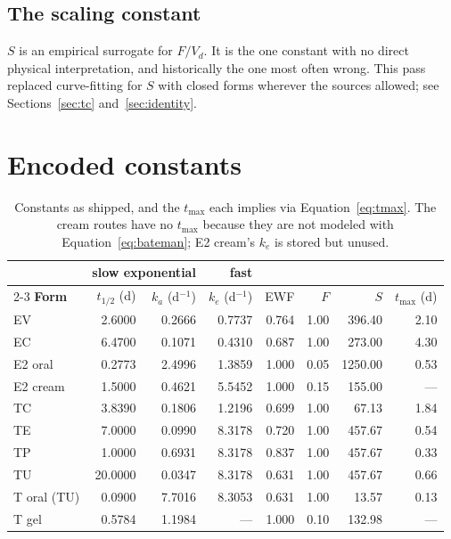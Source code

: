 \documentclass[11pt,a4paper]{article}
\begin{document}
\subsection{The scaling constant}

$S$ is an empirical surrogate for $F/V_d$. It is the one constant with no direct
physical interpretation, and historically the one most often wrong. This pass
replaced curve-fitting for $S$ with closed forms wherever the sources allowed;
see Sections~\ref{sec:tc} and~\ref{sec:identity}.

\section{Encoded constants}

\begin{table}[h]
\centering
\small
\begin{tabular}{@{}lrrrrrrr@{}}
\toprule
& \multicolumn{2}{c}{\textbf{slow exponential}} & \textbf{fast} & & & & \\
\cmidrule(lr){2-3}
\textbf{Form} & $t_{1/2}$ (d) & $k_a$ (d$^{-1}$) & $k_e$ (d$^{-1}$)
              & EWF & $F$ & $S$ & $t_{\max}$ (d) \\
\midrule
EV            & 2.6000 & 0.2666 & 0.7737 & 0.764 & 1.00 & 396.40 & 2.10 \\
EC            & 6.4700 & 0.1071 & 0.4310 & 0.687 & 1.00 & 273.00 & 4.30 \\
E2 oral       & 0.2773 & 2.4996 & 1.3859 & 1.000 & 0.05 & 1250.00 & 0.53 \\
E2 cream      & 1.5000 & 0.4621 & 5.5452 & 1.000 & 0.15 & 155.00 & --- \\
\midrule
TC            & 3.8390 & 0.1806 & 1.2196 & 0.699 & 1.00 & 67.13 & 1.84 \\
TE            & 7.0000 & 0.0990 & 8.3178 & 0.720 & 1.00 & 457.67 & 0.54 \\
TP            & 1.0000 & 0.6931 & 8.3178 & 0.837 & 1.00 & 457.67 & 0.33 \\
TU            & 20.0000 & 0.0347 & 8.3178 & 0.631 & 1.00 & 457.67 & 0.66 \\
T oral (TU)   & 0.0900 & 7.7016 & 8.3053 & 0.631 & 1.00 & 13.57 & 0.13 \\
T gel         & 0.5784 & 1.1984 & ---    & 1.000 & 0.10 & 132.98 & --- \\
\bottomrule
\end{tabular}
\caption{Constants as shipped, and the $t_{\max}$ each implies via
Equation~\ref{eq:tmax}. The cream routes have no $t_{\max}$ because they are not
modeled with Equation~\ref{eq:bateman}; E2 cream's $k_e$ is stored but unused.}
\label{tab:constants}
\end{table}
\end{document}
